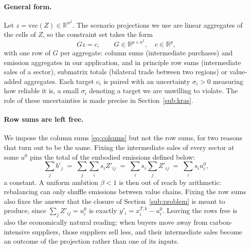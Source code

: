 \documentclass[11pt,a4paper]{article}
\begin{document}
\paragraph{General form.}
Let $z = \mathrm{vec}(Z) \in \mathbb{R}^{n^2}$. The scenario projections we use are linear aggregates of the cells of $Z$, so the constraint set takes the form
\begin{equation}\label{eq:constraints}
  G z = c ,
  \qquad
  G \in \mathbb{R}^{p \times n^2},
  \quad
  c \in \mathbb{R}^p ,
\end{equation}
with one row of $G$ per aggregate: column sums (intermediate purchases) and emission aggregates in our application, and in principle row sums (intermediate sales of a sector), submatrix totals (bilateral trade between two regions) or value-added aggregates. Each target $c_i$ is paired with an uncertainty
$\sigma_i > 0$ measuring how reliable it is, a small $\sigma_i$ denoting a target we are unwilling to violate. The role of these uncertainties is made precise in Section~\ref{sub:kras}.

\paragraph{Row sums are left free.}
We impose the column sums \eqref{eq:colsums} but not the row sums, for two reasons that turn out to be the same. Fixing the intermediate sales of every sector at some $u^0$ pins the total of the embodied emissions defined below:
\begin{equation}\label{eq:rowtrap}
  \sum_j b'_j \;=\; \sum_j \sum_i s_i Z'_{ij} \;=\; \sum_i s_i \sum_j Z'_{ij} \;=\; \sum_i s_i u^0_i ,
\end{equation}
a constant. A uniform ambition $\beta < 1$ is then out of reach by arithmetic: rebalancing can only shuffle emissions between value chains. Fixing the row sums also fixes the answer that the closure of Section~\ref{sub:problem} is meant to produce, since $\sum_j Z'_{ij} = u^0_i$ is exactly $y'_i = x^{T,k}_i - u^0_i$. Leaving the rows free is also the economically natural reading: when buyers move away from carbon-intensive suppliers, those suppliers sell less, and their intermediate sales become an outcome of the projection rather than one of its inputs.

\end{document}
